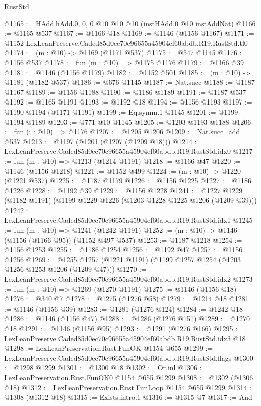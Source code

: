 \begin{lexlean}{RustStd}
\begin{coremodule}
@1165 := HAdd.hAdd.{0, 0, 0} @10 @10 @10 (instHAdd.{0} @10 instAddNat)
@1166 := @1165 @537
@1167 := @1166 @18
@1169 := @1146 (@1156 @1167)
@1171 := @1152 LexLeanPreserve.Caded85d0ec70c96655a45904ef60abdb.R19.RustStd.tl0
@1174 := (m : @10) -> @1169 (@1171 @537)
@1175 := @547 @1145
@1176 := @1156 @537
@1178 := fun (m : @10) => @1175 @1176
@1179 := @1166 @39
@1181 := @1146 (@1156 @1179)
@1182 := @1152 @501
@1185 := (m : @10) -> @1181 (@1182 @537)
@1186 := @676 @1145
@1187 := Nat.succ
@1188 := @1187 @1167
@1189 := @1156 @1188
@1190 := @1186 @1189
@1191 := @1187 @537
@1192 := @1165 @1191
@1193 := @1192 @18
@1194 := @1156 @1193
@1197 := @1190 @1194 (@1171 @1191)
@1199 := Eq.symm.{1} @1145
@1201 := @1199 @1194 @1189
@1203 := @771 @10 @1145
@1205 := @1203 @1193 @1188
@1206 := fun (i : @10) => @1176
@1207 := @1205 @1206
@1209 := Nat.succ_add @537
@1213 := @1197 (@1201 (@1207 (@1209 @18)))
@1214 := LexLeanPreserve.Caded85d0ec70c96655a45904ef60abdb.R19.RustStd.idx0
@1217 := fun (m : @10) => @1213 (@1214 @1191)
@1218 := @1166 @47
@1220 := @1146 (@1156 @1218)
@1221 := @1152 @499
@1224 := (m : @10) -> @1220 (@1221 @537)
@1225 := @1187 @1179
@1226 := @1156 @1225
@1227 := @1186 @1226
@1228 := @1192 @39
@1229 := @1156 @1228
@1241 := @1227 @1229 (@1182 @1191) (@1199 @1229 @1226 (@1203 @1228 @1225 @1206 (@1209 @39)))
@1242 := LexLeanPreserve.Caded85d0ec70c96655a45904ef60abdb.R19.RustStd.idx1
@1245 := fun (m : @10) => @1241 (@1242 @1191)
@1252 := (m : @10) -> @1146 (@1156 (@1166 @95)) (@1152 @497 @537)
@1253 := @1187 @1218
@1254 := @1156 @1253
@1255 := @1186 @1254
@1256 := @1192 @47
@1257 := @1156 @1256
@1269 := @1255 @1257 (@1221 @1191) (@1199 @1257 @1254 (@1203 @1256 @1253 @1206 (@1209 @47)))
@1270 := LexLeanPreserve.Caded85d0ec70c96655a45904ef60abdb.R19.RustStd.idx2
@1273 := fun (m : @10) => @1269 (@1270 @1191)
@1275 := @1146 (@1156 @18)
@1276 := @340 @7
@1278 := @1275 (@1276 @58)
@1279 := @1214 @18
@1281 := @1146 (@1156 @39)
@1283 := @1281 (@1276 @124)
@1284 := @1242 @18
@1286 := @1146 (@1156 @47)
@1288 := @1286 (@1276 @151)
@1289 := @1270 @18
@1291 := @1146 (@1156 @95)
@1293 := @1291 (@1276 @166)
@1295 := LexLeanPreserve.Caded85d0ec70c96655a45904ef60abdb.R19.RustStd.idx3 @18
@1298 := LexLeanPreservation.Rust.FunOK @1154 @655
@1299 := LexLeanPreserve.Caded85d0ec70c96655a45904ef60abdb.R19.RustStd.flags
@1300 := @1298 @1299
@1301 := @1300 @18
@1302 := Or.inl
@1306 := LexLeanPreservation.Rust.FunOK0 @1154 @655 @1299
@1308 := @1302 (@1306 @18)
@1312 := LexLeanPreservation.Rust.FunLoop @1154 @655 @1299
@1314 := @1308 (@1312 @18)
@1315 := Exists.intro.{1}
@1316 := @1315 @7
@1317 := And

\end{coremodule}
\end{lexlean}
